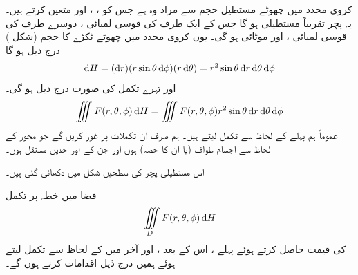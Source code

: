 کروی محدد میں  چھوٹے مستطیل حجم  سے  مراد  وہ    ہے جس کو ، ،  اور  متعین کرتے ہیں۔ یہ پچر تقریباً مستطیلی ہو گا جس کے ایک طرف  کی  قوسی لمبائی  ، دوسرے طرف کی قوسی لمبائی  ،  اور موٹائی   ہو گی۔ یوں   کروی محدد میں چھوٹے ٹکڑے کا حجم   (شکل )   درج ذیل ہو گا
\begin{align}
\dif H=(\dif r)(r\sin\theta\dif\phi)(r\dif\theta)=r^2\sin\theta \dif r\dif \theta\dif \phi
\end{align}
 اور تہرے تکمل کی صورت درج ذیل ہو گی۔
\begin{align*}
\iiint F(r,\theta,\phi)\dif H=\iiint F(r,\theta,\phi) r^2\sin\theta\dif r \dif \theta\dif \phi
\end{align*}
 عموماً  ہم پہلے  کے لحاظ سے تکمل لیتے ہیں۔ ہم  صرف ان تکملات  پر غور کریں گے  جو محور  کے لحاظ سے اجسام طواف  (یا ان کا حصہ) ہوں اور جن کے  اور  حدیں مستقل ہوں۔

اس مستطیلی پچر کی سطحیں شکل  میں دکھائی گئی ہیں۔

فضا میں خطہ  پر تکمل
\begin{align*}
\iiint\limits_D F(r,\theta,\phi)\dif H
\end{align*}
کی قیمت حاصل کرتے ہوئے  پہلے ، اس کے بعد ، اور آخر میں  کے لحاظ سے تکمل لیتے ہوئے ہمیں درج ذیل اقدامات    کرنے ہوں گے۔

